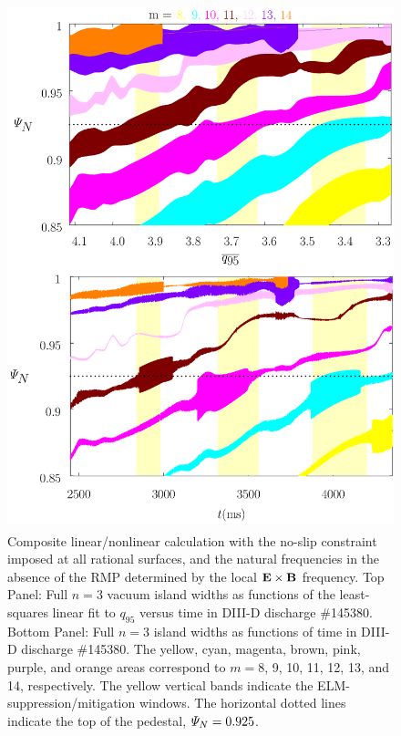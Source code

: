 \documentclass[12pt,prb,aps]{revtex4-1}
\begin{document}
\begin{figure}
\includegraphics[height=6in]{fig3.pdf}
\caption{Composite linear/nonlinear calculation with the no-slip constraint imposed at all rational surfaces, and the natural frequencies
in the absence of the RMP determined by the local  ${\bf E}\times {\bf B}$
frequency. Top Panel: Full  $n=3$ vacuum island widths as functions of the least-squares linear fit to $q_{95}$ versus time 
in   DIII-D discharge \#145380.
Bottom Panel:  Full $n=3$ island widths as functions of time
in   DIII-D discharge \#145380. The yellow, cyan, magenta, brown, pink,
purple, and orange  areas correspond to $m=8$, 9, 10, 11, 12, 13, and 14, respectively. The yellow vertical bands indicate the ELM-suppression/mitigation windows. 
The horizontal dotted lines indicate the top of the pedestal, ${\mit\Psi}_N=0.925$.} \label{fig3}
\end{figure}
\end{document}
